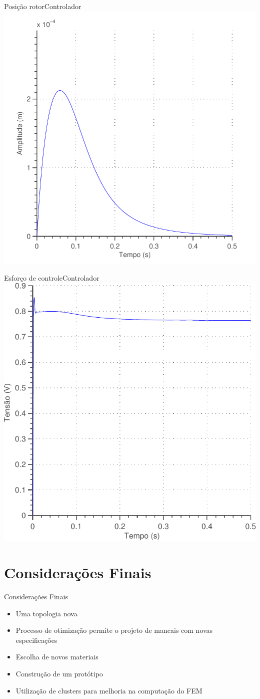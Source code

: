 \documentclass{beamer}
\begin{document}
\begin{frame}{Posição rotor}{Controlador}
\centering
\includegraphics[width=0.7\linewidth]{controle/pid_nlinear_condicao_inicial_posicao}
\end{frame}

\begin{frame}{Esforço de controle}{Controlador}
\centering
\includegraphics[width=0.7\linewidth]{controle/pid_nlinear_condicao_inicial_esforco}
\end{frame}

\section{Considerações Finais}

\begin{frame}{Considerações Finais}
	\begin{itemize}
	\item Uma topologia nova
	\item Processo de otimização permite o projeto de mancais com novas especificações
	\item Escolha de novos materiais
	\item Construção de um protótipo
	\item Utilização de clusters para melhoria na computação do FEM
	\end{itemize}
\end{frame}
\end{document}
